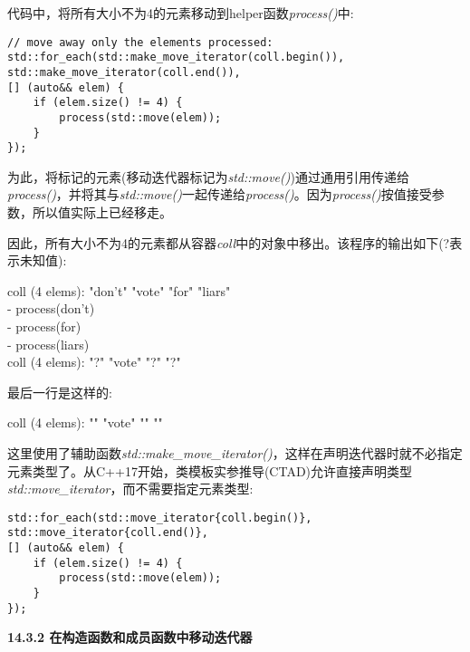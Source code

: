 代码中，将所有大小不为4的元素移动到helper函数\textit{process()}中:\par

\begin{lstlisting}[caption={}]
// move away only the elements processed:
std::for_each(std::make_move_iterator(coll.begin()),
std::make_move_iterator(coll.end()),
[] (auto&& elem) {
	if (elem.size() != 4) {
		process(std::move(elem));
	}
});
\end{lstlisting}

为此，将标记的元素(移动迭代器标记为\textit{std::move()})通过通用引用传递给\textit{process()}，并将其与\textit{std::move()}一起传递给\textit{process()}。因为\textit{process()}按值接受参数，所以值实际上已经移走。\par

因此，所有大小不为4的元素都从容器\textit{coll}中的对象中移出。该程序的输出如下(?表示未知值):\par

\begin{tcolorbox}[colback=white,colframe=black]
coll (4 elems): "don't" "vote" "for" "liars" \\
- process(don't) \\
- process(for) \\
- process(liars) \\
coll (4 elems): "?" "vote" "?" "?"
\end{tcolorbox}

最后一行是这样的:\par

\begin{tcolorbox}[colback=white,colframe=black]
coll (4 elems): "" "vote" "" ""
\end{tcolorbox}

这里使用了辅助函数\textit{std::make\_move\_iterator()}，这样在声明迭代器时就不必指定元素类型了。从C++17开始，类模板实参推导(CTAD)允许直接声明类型\textit{std::move\_iterator}，而不需要指定元素类型:\par

\begin{lstlisting}[caption={}]
std::for_each(std::move_iterator{coll.begin()},
std::move_iterator{coll.end()},
[] (auto&& elem) {
	if (elem.size() != 4) {
		process(std::move(elem));
	}
});
\end{lstlisting}

\hspace*{\fill} \par %
\textbf{14.3.2 在构造函数和成员函数中移动迭代器}


